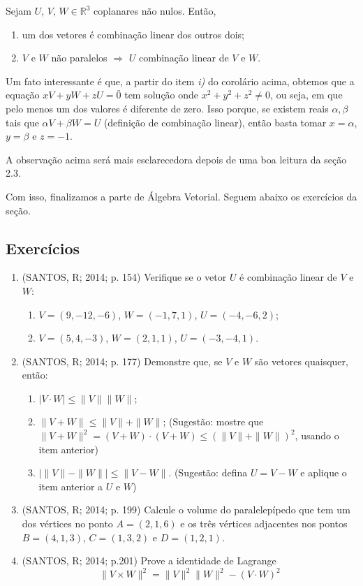 \documentclass[../main.tex]{subfiles}
\begin{document}
		\begin{corolario}
			Sejam $U,\, V,\, W\in \mathbb{R}^3$ coplanares não nulos. Então,
			\begin{enumerate}[label=\roman*)]
				\item um dos vetores é combinação linear dos outros dois;
				\item $V$ e $W$ não paralelos $\Rightarrow$ $U$ combinação linear de $V$ e $W$.
			\end{enumerate}
		\end{corolario}
		Um fato interessante é que, a partir do item \textit{i)} do corolário acima, obtemos que a equação $xV+yW+zU=\bar{0}$ tem solução onde $x^2+y^2+z^2\neq 0$, ou seja, em que pelo menos um dos valores é diferente de zero. Isso porque, se existem reais $\alpha, \beta$ tais que $\alpha V+\beta W= U$ (definição de combinação linear), então basta tomar $x=\alpha$, $y=\beta$ e $z=-1$.
		
		A observação acima será mais esclarecedora depois de uma boa leitura da seção 2.3.
		
		Com isso, finalizamos a parte de Álgebra Vetorial. Seguem abaixo os exercícios da seção.
		\subsection*{Exercícios}
		
		\begin{enumerate}
			\item (SANTOS, R; 2014; p. 154)
			Verifique se o vetor $U$ é combinação linear de $V$ e $W$:
				\begin{enumerate}[label=\alph*)]
					\item $V=(9,-12,-6)$, $W=(-1,7,1)$, $U=(-4,-6,2)$;
					\item $V=(5,4,-3)$, $W=(2,1,1)$, $U=(-3,-4,1)$.
				\end{enumerate}
			\item (SANTOS, R; 2014; p. 177)
			Demonstre que, se $V$ e $W$ são vetores quaisquer, então:
				\begin{enumerate}[label=\alph*)]
					\item $|V\cdot W|\leq \|V\|\|W\|$;
					\item $\|V+W\|\leq \|V\|+\|W\|$; (Sugestão: mostre que $\|V+W\|^2=(V+W)\cdot (V+W)\leq (\|V\|+\|W\|)^2$, usando o item anterior)
					\item $\big|\|V\|-\|W\| \big|\leq \|V-W\|$. (Sugestão: defina $U=V-W$ e aplique o item anterior a $U$ e $W$)
				\end{enumerate}
			\item (SANTOS, R; 2014; p. 199)
			Calcule o volume do paralelepípedo que tem um dos vértices no ponto $A=(2,1,6)$ e os três vértices adjacentes nos pontos $B=(4,1,3)$, $C=(1,3,2)$ e $D=(1,2,1)$.
			\item (SANTOS, R; 2014; p.201)
			Prove a identidade de Lagrange
			\[
			\|V\times W\|^2=\|V\|^2\|W\|^2-(V\cdot W)^2
			\]
		\end{enumerate}
		
\end{document}
